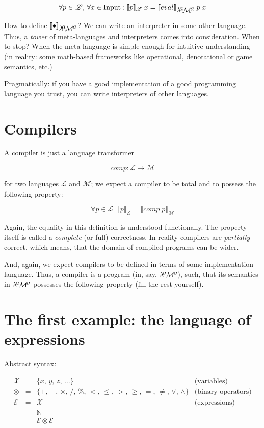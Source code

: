 \documentclass{article}
\newcommand{\sembr}[1]{\llbracket{#1}\rrbracket}
\newcommand{\lama}{$\lambda\kern -.1667em\lower -.5ex\hbox{$a$}\kern -.1000em\lower .2ex\hbox{$\mathcal M$}\kern -.1000em\lower -.5ex\hbox{$a$}$\xspace}
\theoremstyle{definition}
\begin{document}
\[
\forall p \in \mathscr L,\, \forall x\in \mbox{\lstinline|Input|} : \sembr{p}_{\mathscr L}\;x = \sembr{eval}_{\mbox{\lama}}\; p\; x
\]

How to define $\sembr{\bullet}_{\mbox{\lama}}$? We can write an interpreter in some other language. Thus, a \emph{tower} of meta-languages and interpreters
comes into consideration. When to stop? When the meta-language is simple enough for intuitive understanding (in reality: some math-based frameworks like
operational, denotational or game semantics, etc.)

Pragmatically: if you have a good implementation of a good programming language you trust, you can write interpreters of other languages.

\section{Compilers}

A compiler is just a language transformer

\[
comp :\mathscr L \to \mathscr M
\]

for two languages $\mathscr L$ and $\mathscr M$; we expect a compiler to be total and to possess the following property:

\[
\forall p\in\mathscr L\;\;\sembr{p}_{\mathscr L}=\sembr{comp\; p}_{\mathscr M}
\]

Again, the equality in this definition is understood functionally. The property itself is called a \emph{complete} (or full) correctness. In reality
compilers are \emph{partially} correct, which means, that the domain of compiled programs can be wider.

And, again, we expect compilers to be defined in terms of some implementation language. Thus, a compiler is a program (in, say, \lama), such, that
its semantics in \lama possesses the following property (fill the rest yourself).


\section{The first example: the language of expressions}

Abstract syntax:

\[
\begin{array}{rcll}
  \mathscr X & = & \{x,\, y,\, z,\, \dots\}            & \mbox{(variables)}\\
  \otimes    & = & \{+,\, -,\, \times,\, /,\, \%,\, <,\, \le,\, >,\, \ge,\, =,\,\ne,\, \vee,\, \wedge\} & \mbox{(binary operators)}\\
   \mathscr E & = & \mathscr X                    & \mbox{(expressions)}\\
              &   & \mathbb N                     & \\
              &   & \mathscr E \otimes \mathscr E & 
\end{array}
\]
\end{document}
